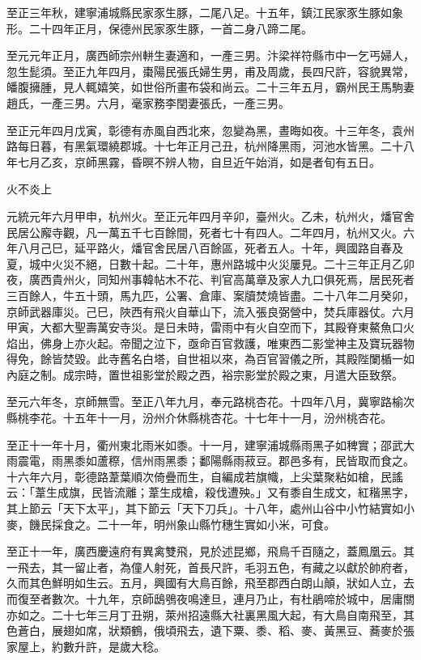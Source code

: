 \begin{pinyinscope}
 至正三年秋，建寧浦城縣民家豕生豚，二尾八足。十五年，鎮江民家豕生豚如象形。二十四年正月，保德州民家豕生豚，一首二身八蹄二尾。



 至元元年正月，廣西師宗州軿生妻適和，一產三男。汴梁祥符縣市中一乞丐婦人，忽生髭須。至正九年四月，棗陽民張氏婦生男，甫及周歲，長四尺許，容貌異常，皤腹擁腫，見人輒嬉笑，如世俗所畫布袋和尚云。二十三年五月，霸州民王馬駒妻趙氏，一產三男。六月，毫家務李閏妻張氏，一產三男。



 至正元年四月戊寅，彰德有赤風自西北來，忽變為黑，晝晦如夜。十三年冬，袁州路每日暮，有黑氣環繞郡城。十七年正月己丑，杭州降黑雨，河池水皆黑。二十八年七月乙亥，京師黑霧，昏暝不辨人物，自旦近午始消，如是者旬有五日。



 火不炎上



 元統元年六月甲申，杭州火。至正元年四月辛卯，臺州火。乙未，杭州火，燔官舍民居公廨寺觀，凡一萬五千七百餘間，死者七十有四人。二年四月，杭州又火。六年八月己巳，延平路火，燔官舍民居八百餘區，死者五人。十年，興國路自春及夏，城中火災不絕，日數十起。二十年，惠州路城中火災屢見。二十三年正月乙卯夜，廣西貴州火，同知州事韓帖木不花、判官高萬章及家人九口俱死焉，居民死者三百餘人，牛五十頭，馬九匹，公署、倉庫、案牘焚燒皆盡。二十八年二月癸卯，京師武器庫災。己巳，陜西有飛火自華山下，流入張良弼營中，焚兵庫器仗。六月甲寅，大都大聖壽萬安寺災。是日未時，雷雨中有火自空而下，其殿脊東鰲魚口火焰出，佛身上亦火起。帝聞之泣下，亟命百官救護，唯東西二影堂神主及寶玩器物得免，餘皆焚毀。此寺舊名白塔，自世祖以來，為百官習儀之所，其殿陛闌楯一如內庭之制。成宗時，置世祖影堂於殿之西，裕宗影堂於殿之東，月遣大臣致祭。



 至元六年冬，京師無雪。至正八年九月，奉元路桃杏花。十四年八月，冀寧路榆次縣桃李花。十五年十一月，汾州介休縣桃杏花。十七年十一月，汾州桃杏花。



 至正十一年十月，衢州東北雨米如黍。十一月，建寧浦城縣雨黑子如稗實；邵武大雨震電，雨黑黍如蘆穄，信州雨黑黍；鄱陽縣雨菽豆。郡邑多有，民皆取而食之。十六年六月，彰德路葦葉順次倚疊而生，自編成若旗幟，上尖葉聚粘如槍，民謠云：「葦生成旗，民皆流離；葦生成槍，殺伐遭殃。」又有黍自生成文，紅稭黑字，其上節云「天下太平」，其下節云「天下刀兵」。十八年，處州山谷中小竹結實如小麥，饑民採食之。二十一年，明州象山縣竹穗生實如小米，可食。



 至正十一年，廣西慶遠府有異禽雙飛，見於述昆鄉，飛鳥千百隨之，蓋鳳凰云。其一飛去，其一留止者，為僮人射死，首長尺許，毛羽五色，有藏之以獻於帥府者，久而其色鮮明如生云。五月，興國有大鳥百餘，飛至郡西白朗山顛，狀如人立，去而復至者數次。十九年，京師鴟鴞夜鳴達旦，連月乃止，有杜鵑啼於城中，居庸關亦如之。二十七年三月丁丑朔，萊州招遠縣大社裏黑風大起，有大鳥自南飛至，其色蒼白，展翅如席，狀類鶴，俄頃飛去，遺下粟、黍、稻、麥、黃黑豆、蕎麥於張家屋上，約數升許，是歲大稔。




\end{pinyinscope}
